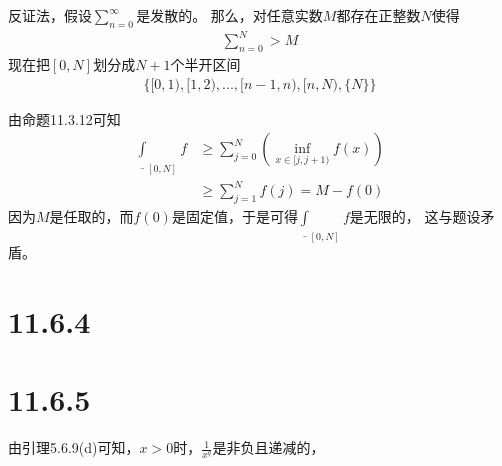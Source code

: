 \documentclass{article}
\begin{document}
\begin{itemize}
        反证法，假设$\sum \limits_{n=0}^\infty$是发散的。
        那么，对任意实数$M$都存在正整数$N$使得
        \begin{align*}
          \sum \limits_{n=0}^{N} > M
        \end{align*}
        现在把$[0, N]$划分成$N+1$个半开区间
        \begin{align*}
          \{[0, 1), [1, 2),...,[n-1, n), [n, N), \{N\}\}
        \end{align*}

        由命题11.3.12可知
        \begin{align*}
          \underline{\int}_{[0, N]} f & \geq \sum\limits_{j=0}^{N} \left( \inf\limits_{x \in [j, j+1)} f(x)  \right)            \\
                                      & \geq \sum\limits_{j=1}^{N} f(j) = M - f(0)
        \end{align*}
        因为$M$是任取的，而$f(0)$是固定值，于是可得$\underline{\int}_{[0, N]} f$是无限的，
        这与题设矛盾。
\end{itemize}

\section*{11.6.4}

\section*{11.6.5}

由引理5.6.9(d)可知，$x > 0$时，$\frac{1}{x^q}$是非负且递减的，
\end{document}
